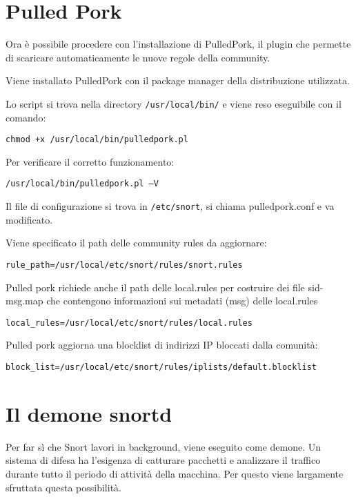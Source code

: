 \section{Pulled Pork}

Ora è possibile procedere con l'installazione di PulledPork, il plugin che permette di scaricare automaticamente le nuove regole della community.

Viene installato PulledPork con il package manager della distribuzione utilizzata.

Lo script si trova nella directory \texttt{/usr/local/bin/} e viene reso eseguibile con il comando:

\begin{verbatim}
chmod +x /usr/local/bin/pulledpork.pl
\end{verbatim}

Per verificare il corretto funzionamento:

\begin{verbatim}
/usr/local/bin/pulledpork.pl –V
\end{verbatim}

Il file di configurazione si trova in \texttt{/etc/snort}, si chiama pulledpork.conf e va modificato.

Viene specificato il path delle community rules da aggiornare:

\begin{verbatim}
rule_path=/usr/local/etc/snort/rules/snort.rules
\end{verbatim}

Pulled pork richiede anche il path delle local.rules per costruire dei file sid-msg.map che contengono informazioni sui metadati (msg) delle local.rules

\begin{verbatim}
local_rules=/usr/local/etc/snort/rules/local.rules
\end{verbatim}

Pulled pork aggiorna una blocklist di indirizzi IP bloccati dalla comunità:
\begin{verbatim}
block_list=/usr/local/etc/snort/rules/iplists/default.blocklist
\end{verbatim}

\section{Il demone snortd}

Per far sì che Snort lavori in background, viene eseguito come demone. Un sistema di difesa ha l'esigenza di catturare pacchetti e analizzare il traffico durante tutto il periodo di attività della macchina. Per questo viene largamente sfruttata questa possibilità.

